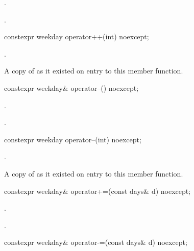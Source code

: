\begin{itemdescr}
\pnum
\effects
{}.

\pnum
\returns
{}.
\end{itemdescr}

%
\begin{itemdecl}
constexpr weekday operator++(int) noexcept;
\end{itemdecl}

\begin{itemdescr}
\pnum
\effects
{}.

\pnum
\returns
A copy of  as it existed on entry to this member function.
\end{itemdescr}

%
\begin{itemdecl}
constexpr weekday& operator--() noexcept;
\end{itemdecl}

\begin{itemdescr}
\pnum
\effects
{}.

\pnum
\returns
{}.
\end{itemdescr}

%
\begin{itemdecl}
constexpr weekday operator--(int) noexcept;
\end{itemdecl}

\begin{itemdescr}
\pnum
\effects
{}.

\pnum
\returns
A copy of  as it existed on entry to this member function.
\end{itemdescr}

%
\begin{itemdecl}
constexpr weekday& operator+=(const days& d) noexcept;
\end{itemdecl}

\begin{itemdescr}
\pnum
\effects
{}.

\pnum
\returns
{}.
\end{itemdescr}

%
\begin{itemdecl}
constexpr weekday& operator-=(const days& d) noexcept;
\end{itemdecl}

